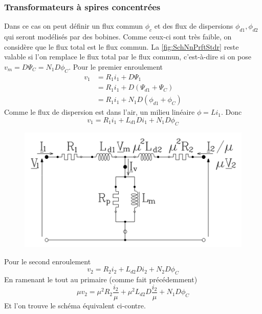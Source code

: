 		\subsubsection{Transformateurs à spires concentrées}
		Dans ce cas on peut définir un flux commun $\phi_c$ et des flux de 
		dispersions $\phi_{d1},\phi_{d2}$ qui seront modélisés par des bobines. 
		Comme ceux-ci sont très faible, on 
		considère que le flux total est le flux commun. La \autoref{fig:SchNnPrftStdr}
		reste valable si l'on remplace le flux total par le flux commun, c'est-à-dire 
		si on pose $v_m = D\Psi_C=N_1D\phi_C$.
		Pour le premier enroulement
		\begin{equation}
		\begin{array}{ll}
		v_1 &= R_1i_1 + D\Psi_1\\
		&= R_1i_1 + D(\Psi_{d1}+\Psi_C)\\
		&= R_1i_1 + N_1D(\phi_{d1}+\phi_C)
		\end{array}
		\end{equation}
		Comme le flux de dispersion est dans l'air, un milieu linéaire $\phi = Li_1$. 
		Donc
		\begin{equation}
		v_1 = R_1i_1 + L_{d1}Di_1+N_1D\phi_C
		\end{equation}
		\begin{figure}
		\includegraphics[scale=0.5]{ch3/imager3.png}
		\end{figure}				
		Pour le second enroulement	
		\begin{equation}
		v_2 = R_2i_2 + L_{d2}Di_2+N_2D\phi_C
		\end{equation}	
		En ramenant le tout au primaire (comme fait précédemment)
		\begin{equation}
		\mu v_2 = \mu^2R_2\dfrac{i_2}{\mu}+\mu^2L_{d2}D\dfrac{i_2}{\mu}+N_1D\phi_C
		\end{equation}
		Et l'on trouve le schéma équivalent ci-contre.\\
		
